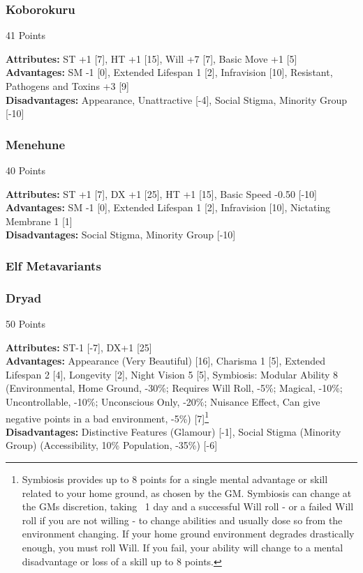 \begin{multicols*}{3}
	\subsubsection*{Koborokuru}
	\begin{flushright}
		41 Points
	\end{flushright}
	\textbf{Attributes:}
	ST +1 [7], HT +1 [15], Will +7 [7], Basic Move +1 [5]
	\textbf{Advantages:}
	SM -1 [0], Extended Lifespan 1 [2], Infravision [10], Resistant, Pathogens and Toxins +3 [9]
	\\\textbf{Disadvantages:} 
	Appearance, Unattractive [-4], Social Stigma, Minority Group [-10]
	
	\subsubsection*{Menehune}
	\begin{flushright}
		40 Points
	\end{flushright}
	\textbf{Attributes:}
	ST +1 [7], DX +1 [25], HT +1 [15], Basic Speed -0.50 [-10]
	\textbf{Advantages:}
	SM -1 [0], Extended Lifespan 1 [2], Infravision [10], Nictating Membrane 1 [1]
	\\\textbf{Disadvantages:} 
	Social Stigma, Minority Group [-10]
	
	\subsubsection{Elf Metavariants}
	
	\subsubsection*{Dryad}
	\begin{flushright}
		50 Points
	\end{flushright}
	\textbf{Attributes:} 
	ST-1 [-7], DX+1 [25]
	\\\textbf{Advantages:} 
	Appearance (Very Beautiful) [16], Charisma 1 [5], Extended Lifespan 2 [4], Longevity [2], Night Vision 5 [5], Symbiosis: Modular Ability 8 (Environmental, Home Ground, -30\%; Requires Will Roll, -5\%; Magical, -10\%; Uncontrollable, -10\%; Unconscious Only, -20\%; Nuisance Effect, Can give negative points in a bad environment, -5\%) [7]\footnote{Symbiosis provides up to 8 points for a single mental advantage or skill related to your home ground, as chosen by the GM. Symbiosis can change at the GMs discretion, taking ~1 day and a successful Will roll - or a failed Will roll if you are not willing - to change abilities and usually dose so from the environment changing. If your home ground environment degrades drastically enough, you must roll Will. If you fail, your ability will change to a mental disadvantage or loss of a skill up to 8 points.}
	\\\textbf{Disadvantages:} 
	Distinctive Features (Glamour) [-1], Social Stigma (Minority Group) (Accessibility, 10\% Population, -35\%) [-6]
	

\end{multicols*}
